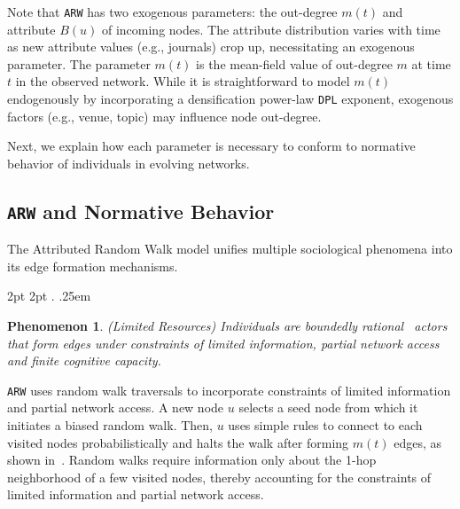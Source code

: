 Note that \texttt{ARW} has two exogenous parameters: the out-degree
$m(t)$ and attribute $B(u)$ of incoming nodes.
The attribute distribution varies with time as new attribute values (e.g., journals) crop up, necessitating an exogenous
parameter. The parameter $m(t)$ is the mean-field value
of out-degree $m$ at time $t$ in the observed network.
While it is straightforward to model $m(t)$
endogenously by incorporating a densification power-law \texttt{DPL} exponent,
exogenous factors (e.g., venue, topic) may influence node out-degree.

Next, we explain how each parameter is necessary to conform to normative
behavior of individuals in evolving networks.

\subsection{\texttt{ARW} and Normative Behavior}
\label{sub:Model Interpretation}
The Attributed Random Walk model unifies multiple sociological phenomena
into its edge formation mechanisms.

  {2pt} %
  {2pt} %
  {\itshape} %
  {} %
  {\bfseries} %
  {.} %
  {.25em} %
  {} %

\theoremstyle{exampstyle} \newtheorem{ph}{Phenomenon}

\begin{ph}
	(Limited Resources) Individuals are boundedly rational~\cite{simon1972theories,gigerenzer1996reasoning,lipman1995information}
	actors that form edges under constraints of limited information, partial network access and finite cognitive capacity.
\end{ph}
\texttt{ARW} uses random walk traversals to incorporate constraints of limited information
and partial network access. A new node $u$ selects a seed node from which it
initiates a biased random walk. Then, $u$ uses simple rules to connect to each visited
nodes probabilistically and halts the walk after forming $m(t)$ edges, as shown in~. Random walks require information only about the
1-hop neighborhood of a few visited nodes, thereby accounting for  the constraints of limited information and partial network access.

